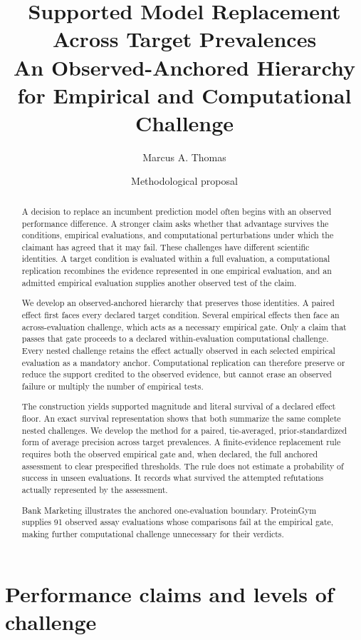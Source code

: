 \documentclass[11pt]{article}
\title{Supported Model Replacement Across Target Prevalences\\
\large An Observed-Anchored Hierarchy for Empirical and Computational Challenge}
\author{Marcus A. Thomas}
\date{Methodological proposal}
\theoremstyle{remark}
\begin{document}
\maketitle

\begin{abstract}
A decision to replace an incumbent prediction model often begins with an
observed performance difference. A stronger claim asks whether that advantage
survives the conditions, empirical evaluations, and computational
perturbations under which the claimant has agreed that it may fail. These
challenges have different scientific identities. A target condition is
evaluated within a full evaluation, a computational replication recombines
the evidence represented in one empirical evaluation, and an admitted
empirical evaluation supplies another observed test of the claim.

We develop an observed-anchored hierarchy that preserves those identities. A
paired effect first faces every declared target condition. Several empirical
effects then face an across-evaluation challenge, which acts as a necessary
empirical gate. Only a claim that passes that gate proceeds to a declared
within-evaluation computational challenge. Every nested challenge retains the
effect actually observed in each selected empirical evaluation as a mandatory
anchor. Computational replication can therefore preserve or reduce the support
credited to the observed evidence, but cannot erase an observed failure or
multiply the number of empirical tests.

The construction yields supported magnitude and literal survival of a declared
effect floor. An exact survival representation shows that both summarize the
same complete nested challenges. We develop the method for a paired,
tie-averaged, prior-standardized form of average precision across target
prevalences. A finite-evidence replacement rule requires both the observed
empirical gate and, when declared, the full anchored assessment to clear
prespecified thresholds. The rule does not estimate a probability of success
in unseen evaluations. It records what survived the attempted refutations
actually represented by the assessment.

Bank Marketing illustrates the anchored one-evaluation boundary. ProteinGym
supplies 91 observed assay evaluations whose comparisons fail at the empirical
gate, making further computational challenge unnecessary for their verdicts.
\end{abstract}


\section{Performance claims and levels of challenge}
\label{sec:introduction}
\end{document}
